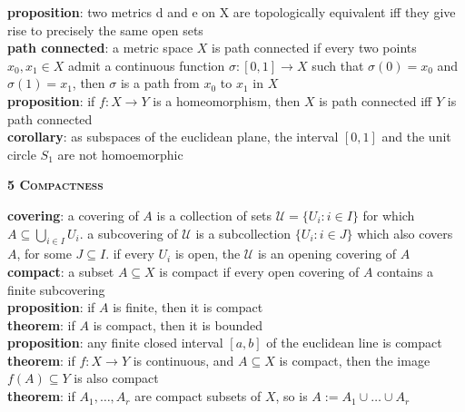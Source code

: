 \documentclass[a4paper]{article}
\begin{document}
\begin{multicols}{2}
\begin{framed}
	    
	\noindent
	\textbf{proposition}: two metrics d and e on X are topologically equivalent iff they give rise to precisely the same open sets\\
	
	\noindent
	\textbf{path connected}: a metric space $X$ is path connected if every two points $x_0, x_1 \in X$ admit a continuous function $\sigma: [0, 1] \rightarrow X$ such that $\sigma(0) = x_0$ and $\sigma(1) = x_1$, then $\sigma$ is a path from $x_0$ to $x_1$ in $X$\\
	
	\noindent
	\textbf{proposition}: if $f: X \rightarrow Y$ is a homeomorphism, then $X$ is path connected iff $Y$ is path connected\\
	
	\noindent
	\textbf{corollary}: as subspaces of the euclidean plane, the interval $[0, 1]$ and the unit circle $S_1$ are not homoemorphic
\end{framed}

\newpage
\begin{framed}
	\begin{center}
		\textbf{\textsc{5 Compactness}}
	\end{center}
	\textbf{covering}: a covering of $A$ is a collection of sets $\mathcal{U} = \{U_i : i \in I\}$ for which $A \subseteq \bigcup_{i \in I} U_i$. a subcovering of $\mathcal{U}$ is a subcollection $\{U_i : i \in J\}$ which also covers $A$, for some $J \subseteq I$. if every $U_i$ is open, the $\mathcal{U}$ is an opening covering of $A$\\
	
	\noindent
	\textbf{compact}: a subset $A \subseteq X$ is compact if every open covering of $A$ contains a finite subcovering\\
	
	\noindent
	\textbf{proposition}: if $A$ is finite, then it is compact\\
	
	\noindent
	\textbf{theorem}: if $A$ is compact, then it is bounded\\
	
	\noindent
	\textbf{proposition}: any finite closed interval $[a,b]$ of the euclidean line is compact\\
	
	\noindent
	\textbf{theorem}: if $f: X \rightarrow Y$ is continuous, and $A \subseteq X$ is compact, then the image $f(A) \subseteq Y$ is also compact\\
	
	\noindent
	\textbf{theorem}: if $A_1, \dots ,A_r$ are compact subsets of $X$, so is $A := A_1 \cup \dots \cup A_r$
	

\end{framed}
\end{multicols}
\end{document}
